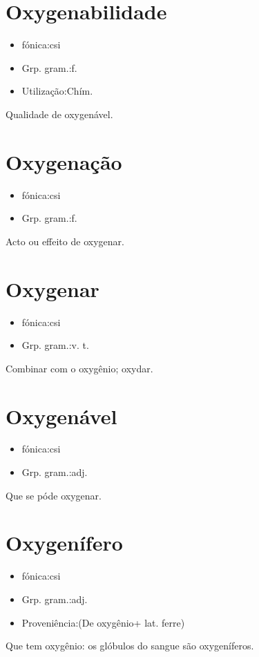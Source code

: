 \section{Oxygenabilidade}
\begin{itemize}
\item {fónica:csi}
\end{itemize}
\begin{itemize}
\item {Grp. gram.:f.}
\end{itemize}
\begin{itemize}
\item {Utilização:Chím.}
\end{itemize}
Qualidade de oxygenável.
\section{Oxygenação}
\begin{itemize}
\item {fónica:csi}
\end{itemize}
\begin{itemize}
\item {Grp. gram.:f.}
\end{itemize}
Acto ou effeito de oxygenar.
\section{Oxygenar}
\begin{itemize}
\item {fónica:csi}
\end{itemize}
\begin{itemize}
\item {Grp. gram.:v. t.}
\end{itemize}
Combinar com o oxygênio; oxydar.
\section{Oxygenável}
\begin{itemize}
\item {fónica:csi}
\end{itemize}
\begin{itemize}
\item {Grp. gram.:adj.}
\end{itemize}
Que se póde oxygenar.
\section{Oxygenífero}
\begin{itemize}
\item {fónica:csi}
\end{itemize}
\begin{itemize}
\item {Grp. gram.:adj.}
\end{itemize}
\begin{itemize}
\item {Proveniência:(De \textunderscore oxygênio\textunderscore  + lat. \textunderscore ferre\textunderscore )}
\end{itemize}
Que tem oxygênio: \textunderscore os glóbulos do sangue são oxygeníferos\textunderscore .
